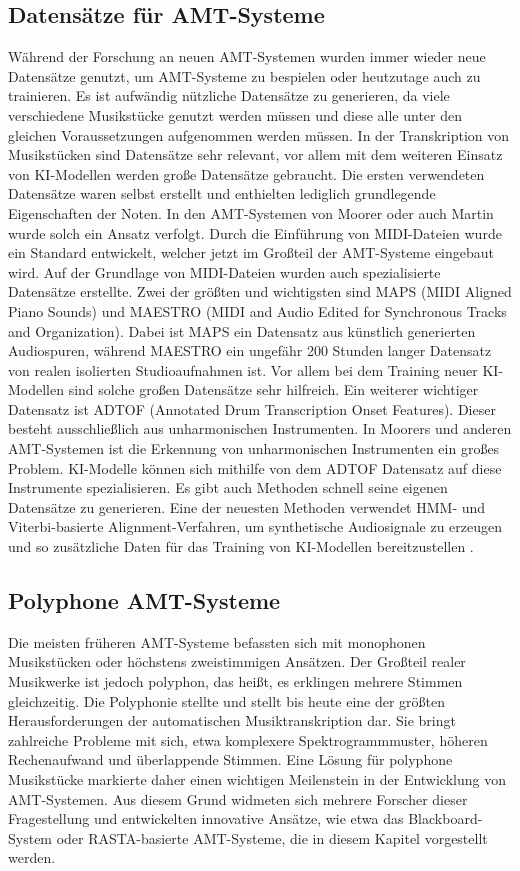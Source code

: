 \subsection{Datensätze für AMT-Systeme}
Während der Forschung an neuen AMT-Systemen wurden immer wieder neue Datensätze genutzt,
um AMT-Systeme zu bespielen oder heutzutage auch zu trainieren.
Es ist aufwändig nützliche Datensätze zu generieren,
da viele verschiedene Musikstücke genutzt werden müssen und diese alle unter den gleichen Voraussetzungen aufgenommen werden müssen.
In der Transkription von Musikstücken sind Datensätze sehr relevant,
vor allem mit dem weiteren Einsatz von KI-Modellen werden große Datensätze gebraucht.
Die ersten verwendeten Datensätze waren selbst erstellt und enthielten lediglich grundlegende Eigenschaften der Noten.
In den AMT-Systemen von Moorer \cite{Moorer1977} oder auch Martin \cite{Martin1996} wurde solch ein Ansatz verfolgt.
Durch die Einführung von MIDI-Dateien wurde ein Standard entwickelt,
welcher jetzt im Großteil der AMT-Systeme eingebaut wird.
Auf der Grundlage von MIDI-Dateien wurden auch spezialisierte Datensätze erstellte.
Zwei der größten und wichtigsten sind MAPS (MIDI Aligned Piano Sounds) und
MAESTRO (MIDI and Audio Edited for Synchronous Tracks and Organization).
Dabei ist MAPS ein Datensatz aus künstlich generierten Audiospuren,
während MAESTRO ein ungefähr 200 Stunden langer Datensatz von realen isolierten Studioaufnahmen ist.
Vor allem bei dem Training neuer KI-Modellen sind solche großen Datensätze sehr hilfreich.
Ein weiterer wichtiger Datensatz ist ADTOF (Annotated Drum Transcription Onset Features).
Dieser besteht ausschließlich aus unharmonischen Instrumenten.
In Moorers und anderen AMT-Systemen ist die Erkennung von unharmonischen Instrumenten ein großes Problem.
KI-Modelle können sich mithilfe von dem ADTOF Datensatz auf diese Instrumente spezialisieren.
Es gibt auch Methoden schnell seine eigenen Datensätze zu generieren.
Eine der neuesten Methoden verwendet HMM- und Viterbi-basierte Alignment-Verfahren,
um synthetische Audiosignale zu erzeugen und so zusätzliche Daten für das Training
von KI-Modellen bereitzustellen \cite{joysingh2019development}.

\subsection{Polyphone AMT-Systeme}
Die meisten früheren AMT-Systeme befassten sich mit monophonen Musikstücken oder höchstens zweistimmigen Ansätzen.
Der Großteil realer Musikwerke ist jedoch polyphon, das heißt, es erklingen mehrere Stimmen gleichzeitig.
Die Polyphonie stellte und stellt bis heute eine der größten Herausforderungen der automatischen Musiktranskription dar.
Sie bringt zahlreiche Probleme mit sich, etwa komplexere Spektrogrammmuster, höheren Rechenaufwand und überlappende Stimmen.
Eine Lösung für polyphone Musikstücke markierte daher einen wichtigen Meilenstein in der Entwicklung von AMT-Systemen.
Aus diesem Grund widmeten sich mehrere Forscher dieser Fragestellung und entwickelten innovative Ansätze,
wie etwa das Blackboard-System oder RASTA-basierte AMT-Systeme, die in diesem Kapitel vorgestellt werden.

